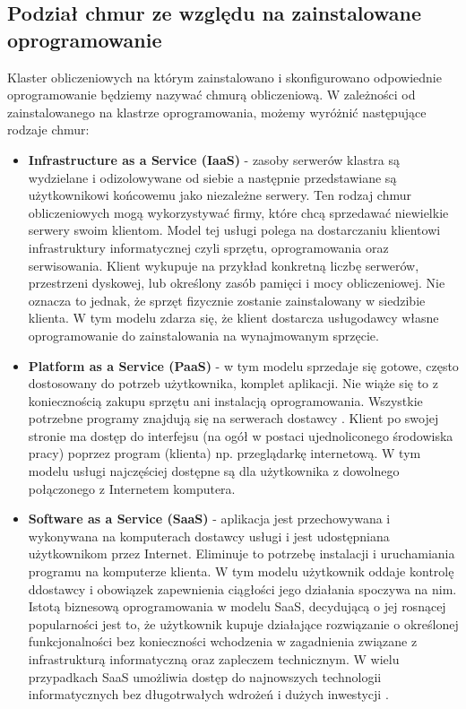 \documentclass[10pt,a4paper,titlepage,twoside]{report}
\begin{document}
\subsection{Podział chmur ze względu na zainstalowane oprogramowanie}\indent \indent Klaster obliczeniowych na którym zainstalowano i skonfigurowano odpowiednie oprogramowanie będziemy nazywać chmurą obliczeniową. W zależności od zainstalowanego na klastrze oprogramowania, możemy wyróżnić następujące rodzaje chmur\cite{ad6}:
\begin{itemize}
	\item \textbf{Infrastructure as a Service (IaaS)} - zasoby serwerów klastra są wydzielane i odizolowywane od siebie a następnie przedstawiane są użytkownikowi końcowemu jako niezależne serwery. Ten rodzaj chmur obliczeniowych mogą wykorzystywać firmy, które chcą sprzedawać niewielkie serwery swoim klientom. Model tej usługi polega na dostarczaniu klientowi infrastruktury informatycznej czyli sprzętu, oprogramowania oraz serwisowania. Klient wykupuje na przykład konkretną liczbę serwerów, przestrzeni dyskowej, lub określony zasób pamięci i mocy obliczeniowej. Nie oznacza to jednak, że sprzęt fizycznie zostanie zainstalowany w siedzibie klienta\cite{ad7}. W tym modelu zdarza się, że klient dostarcza usługodawcy własne oprogramowanie do zainstalowania na wynajmowanym sprzęcie.
	\item \textbf{Platform as a Service (PaaS)} - w tym modelu sprzedaje się gotowe, często dostosowany do potrzeb użytkownika, komplet aplikacji. Nie wiąże się to z koniecznością zakupu sprzętu ani instalacją oprogramowania. Wszystkie potrzebne programy znajdują się na serwerach dostawcy \cite{ad9}. Klient po swojej stronie ma dostęp do interfejsu (na ogół w postaci ujednoliconego środowiska pracy) poprzez program (klienta) np. przeglądarkę internetową. W tym modelu usługi najczęściej dostępne są dla użytkownika z dowolnego połączonego z Internetem komputera.
	\item \textbf{Software as a Service (SaaS)} - aplikacja jest przechowywana i wykonywana na komputerach dostawcy usługi i jest udostępniana użytkownikom przez Internet. Eliminuje to potrzebę instalacji i uruchamiania programu na komputerze klienta. W tym modelu użytkownik oddaje kontrolę ddostawcy i obowiązek zapewnienia ciągłości jego działania spoczywa na nim. Istotą biznesową oprogramowania w modelu SaaS, decydującą o jej rosnącej popularności jest to, że użytkownik kupuje działające rozwiązanie o określonej funkcjonalności bez konieczności wchodzenia w zagadnienia związane z infrastrukturą informatyczną oraz zapleczem technicznym. W wielu przypadkach SaaS umożliwia dostęp do najnowszych technologii informatycznych bez długotrwałych wdrożeń i dużych inwestycji \cite{ad8}.

\end{itemize}
\end{document}
